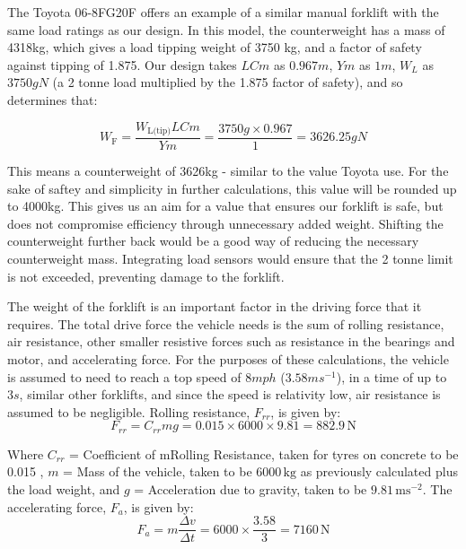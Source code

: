 \documentclass[12pt]{article}
\begin{document}
The Toyota 06-8FG20F \cite{Toyota} offers an example of a similar manual forklift with the same load ratings as our design. In this model, the counterweight has a mass of 4318kg, which gives a load tipping weight of 3750 kg, and a factor of safety against tipping of 1.875. Our design takes $LCm$ as $0.967m$, $Ym$ as $1m$, $W_L$ as $3750gN$ (a 2 tonne load multiplied by the 1.875 factor of safety), and so determines that:

\vspace{-10pt}
\begin{equation}
    W_{\text{F}} = \frac{W_{\text{L(tip)}}LCm}{Ym} = \frac{3750g \times 0.967}{1} = 3626.25gN
\end{equation}
\vspace{-35pt}

This means a counterweight of 3626kg - similar to the value Toyota use. For the sake of saftey and simplicity in further calculations, this value will be rounded up to 4000kg. This gives us an aim for a value that ensures our forklift is safe, but does not compromise efficiency through unnecessary added weight. Shifting the  counterweight further back would be a good way of reducing the necessary counterweight mass. Integrating load sensors would ensure that the 2 tonne limit is not exceeded, preventing damage to the forklift.

The weight of the forklift is an important factor in the driving force that it requires. The total drive force the vehicle needs is the sum of rolling resistance, air resistance, other smaller resistive forces such as resistance in the bearings and motor, and accelerating force. For the purposes of these calculations, the vehicle is assumed to need to reach a top speed of $8mph$ ($3.58ms^{-1}$), in a time of up to $3s$, similar other forklifts, and since the speed is relativity low, air resistance is assumed to be negligible. Rolling resistance, $F_{rr}$, is given by:
\vspace{-20pt}
\begin{equation}
    F_{rr} = C_{rr} m g = 0.015 \times 6000 \times 9.81 =  882.9 \, \text{N}
\end{equation}

Where \( C_{rr} \) = Coefficient of mRolling Resistance, taken for tyres on concrete to be 0.015  \cite{RollingResistance}, \( m \) = Mass of the vehicle, taken to be \( 6000 \, \text{kg} \) as previously calculated plus the load weight, and \( g \) = Acceleration due to gravity, taken to be \( 9.81 \, \text{ms}^{-2} \). The accelerating force, \( F_a \), is given by:
\vspace{-20pt}
\begin{equation}
    F_a = m\frac{\Delta v}{\Delta t} = 6000\times \frac{3.58}{3} = 7160 \, \text{N}
\end{equation}
\end{document}
